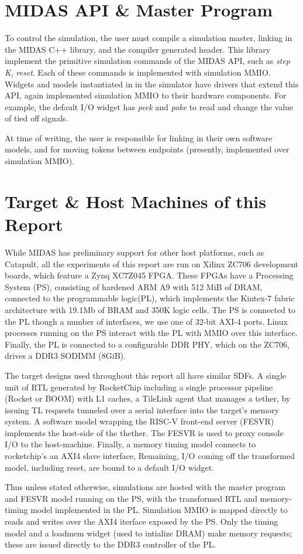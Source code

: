 \section{MIDAS API \& Master Program}

To control the simulation, the user must compile a simulation master, linking
in the MIDAS C++ library, and the compiler generated header. This library
implement the primitive simulation commands of the MIDAS API, such as
\emph{step K}, \emph{reset}. Each of these commands is implemented with
simulation MMIO.  Widgets and models instantiated in in the simulator have
drivers that extend this API, again implemented simulation MMIO to their
hardware components. For example, the default I/O widget has \emph{peek} and
\emph{poke} to read and change the value of tied off signals.

At time of writing, the user is responsible for linking in their own software
models, and for moving tokens between endpoints (presently, implemented over
simulation MMIO).

\section{Target \& Host Machines of this Report}

While MIDAS has preliminary support for other host platforms, such as Catapult,
all the experiments of this report are run on Xilinx ZC706 development boards,
which feature a Zynq XC7Z045 FPGA. These FPGAs have a Processing System (PS),
consisting of hardened ARM A9 with 512 MiB of DRAM, connected to the
programmable logic(PL), which implements the Kintex-7 fabric architecture with
19.1Mb of BRAM and 350K logic cells. The PS is connected to the PL though a
number of interfaces, we use one of 32-bit AXI-4 ports. Linux processes
running on the PS interact with the PL with MMIO over this interface.  Finally,
the PL is connected to a configurable DDR PHY, which on the ZC706, drives a
DDR3 SODIMM (8GiB).

The target designs used throughout this report all have similar SDFs.
 A single unit of RTL generated by RocketChip
including a single processor pipeline (Rocket or BOOM) with L1 caches, a
TileLink agent that manages a tether, by issuing TL requests tunneled over a
serial interface into the target's memory system. A software model wrapping the
RISC-V front-end server (FESVR) implements the host-side of the thether. The
FESVR is used to proxy console I/O to the host-machine.  Finally, a memory
timing model connects to rocketchip's an AXI4 slave interface, Remaining, I/O
coming off the transformed model, including reset, are bound to a default I/O
widget.

Thus unless stated otherwise, simulations are hosted with the master program
and FESVR model running on the PS, with the transformed RTL and memory-timing
model implemented in the PL. Simulation MMIO is mapped directly to reads and
writes over the AXI4 iterface exposed by the PS. Only the timing model and a
loadmem widget (used to intialize DRAM) make memory requests; these are issued
directly to the DDR3 controller of the PL.
